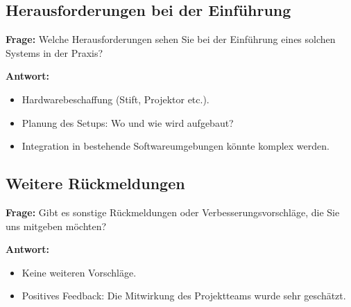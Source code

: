 \subsection{Herausforderungen bei der Einführung}

\textbf{Frage:} Welche Herausforderungen sehen Sie bei der Einführung eines solchen Systems in der Praxis?

\textbf{Antwort:}
\begin{itemize}
    \item Hardwarebeschaffung (Stift, Projektor etc.).
    \item Planung des Setups: Wo und wie wird aufgebaut?
    \item Integration in bestehende Softwareumgebungen könnte komplex werden.
\end{itemize}

\subsection{Weitere Rückmeldungen}

\textbf{Frage:} Gibt es sonstige Rückmeldungen oder Verbesserungsvorschläge, die Sie uns mitgeben möchten?

\textbf{Antwort:}
\begin{itemize}
    \item Keine weiteren Vorschläge.
    \item Positives Feedback: Die Mitwirkung des Projektteams wurde sehr geschätzt.
\end{itemize}
